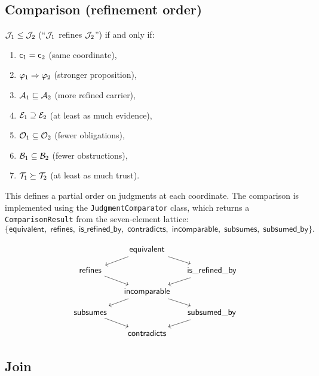 \documentclass[11pt]{article}
\begin{document}
\subsection{Comparison (refinement order)}\label{ssec:comparison}

\begin{definition}[Refinement]\label{def:refinement}
$\mathcal{J}_1 \leq \mathcal{J}_2$ (``$\mathcal{J}_1$ refines $\mathcal{J}_2$'') if and only if:
\begin{enumerate}[label=(R\arabic*)]
  \item $\mathsf{c}_1 = \mathsf{c}_2$ (same coordinate),
  \item $\varphi_1 \Rightarrow \varphi_2$ (stronger proposition),
  \item $\mathcal{A}_1 \sqsubseteq \mathcal{A}_2$ (more refined carrier),
  \item $\mathcal{E}_1 \supseteq \mathcal{E}_2$ (at least as much evidence),
  \item $\mathcal{O}_1 \subseteq \mathcal{O}_2$ (fewer obligations),
  \item $\mathcal{B}_1 \subseteq \mathcal{B}_2$ (fewer obstructions),
  \item $\mathcal{T}_1 \succeq \mathcal{T}_2$ (at least as much trust).
\end{enumerate}
\end{definition}

This defines a partial order on judgments at each coordinate.
The comparison is implemented using the \texttt{JudgmentComparator} class,
which returns a \texttt{ComparisonResult} from the seven-element lattice:
\[
  \{\mathsf{equivalent},\; \mathsf{refines},\;
    \mathsf{is\_refined\_by},\; \mathsf{contradicts},\;
    \mathsf{incomparable},\; \mathsf{subsumes},\;
    \mathsf{subsumed\_by}\}.
\]

\begin{equation}\label{eq:refinement-lattice}
\begin{tikzcd}[row sep=small, column sep=small]
  & \mathsf{equivalent} \arrow[dl] \arrow[dr] & \\
  \mathsf{refines} \arrow[dr] & & \mathsf{is\_refined\_by} \arrow[dl] \\
  & \mathsf{incomparable} \arrow[dl] \arrow[dr] & \\
  \mathsf{subsumes} \arrow[dr] & & \mathsf{subsumed\_by} \arrow[dl] \\
  & \mathsf{contradicts} &
\end{tikzcd}
\end{equation}

\subsection{Join}\label{ssec:join}
\end{document}
